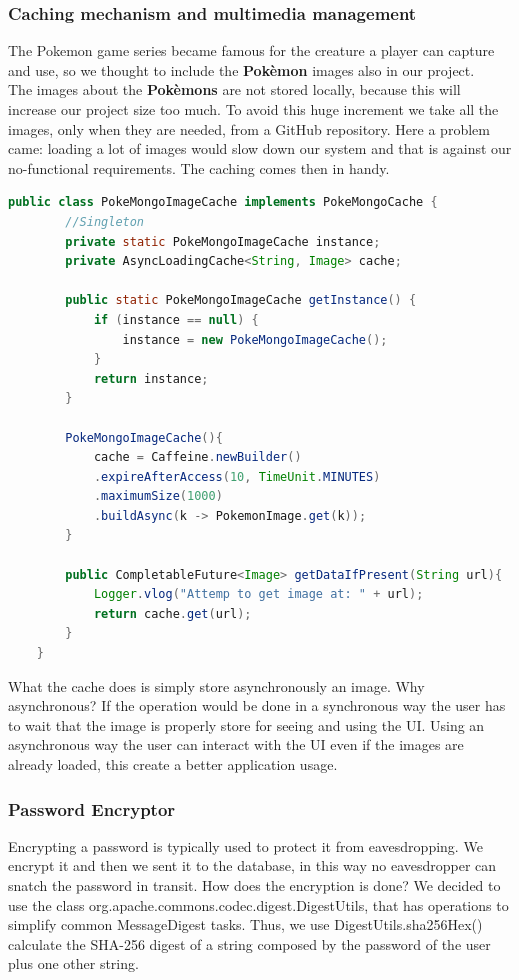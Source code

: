 \subsubsection{Caching mechanism and multimedia management}
The Pokemon game series became famous for the creature a player can capture and use, so we thought to include the \textbf{Pokèmon} images also in our project.\\
The images about the \textbf{Pokèmons} are not stored locally, because this will increase our project size too much. To avoid this huge increment we take all the images, only when they are needed, from a GitHub repository. Here a problem came: loading a lot of images would slow down our system and that is against our no-functional requirements. The caching comes then in handy.

\begin{lstlisting}[language=Java]
	public class PokeMongoImageCache implements PokeMongoCache {
		//Singleton
		private static PokeMongoImageCache instance;
		private AsyncLoadingCache<String, Image> cache;
		
		public static PokeMongoImageCache getInstance() {
			if (instance == null) {
				instance = new PokeMongoImageCache();
			}
			return instance;
		}
		
		PokeMongoImageCache(){
			cache = Caffeine.newBuilder()
			.expireAfterAccess(10, TimeUnit.MINUTES) 
			.maximumSize(1000) 
			.buildAsync(k -> PokemonImage.get(k));
		}
		
		public CompletableFuture<Image> getDataIfPresent(String url){
			Logger.vlog("Attemp to get image at: " + url);
			return cache.get(url);
		}
	}
\end{lstlisting}

What the cache does is simply store asynchronously an image. Why asynchronous? If the operation would be done in a synchronous way the user has to wait that the image is properly store for seeing and using the UI. Using an asynchronous way the user can interact with the UI even if the images are already loaded, this create a better application usage.
\subsubsection{Password Encryptor}
Encrypting a password is typically used to protect it from eavesdropping. We encrypt it and then we sent it to the database, in this way no eavesdropper can snatch the password in transit.
How does the encryption is done? We decided to use the class org.apache.commons.codec.digest.DigestUtils, that has operations to simplify common MessageDigest tasks. Thus, we use DigestUtils.sha256Hex() calculate the SHA-256 digest of a string composed by the password of the user plus one other string.

